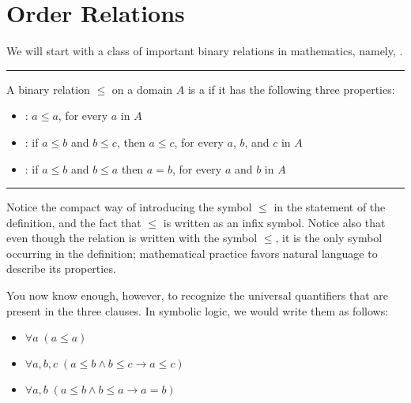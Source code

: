 \documentclass[letterpaper,10pt,english]{sphinxmanual}
\begin{document}
\section{Order Relations}
\label{\detokenize{relations:order-relations}}\label{\detokenize{relations:id2}}
\sphinxAtStartPar
We will start with a class of important binary relations in mathematics, namely, .


\bigskip\hrule\bigskip


\sphinxAtStartPar
{} A binary relation \(\leq\) on a domain \(A\) is a  if it has the following three properties:
\begin{itemize}
\item {} 
\sphinxAtStartPar
{}: \(a \leq a\), for every \(a\) in \(A\)

\item {} 
\sphinxAtStartPar
{}: if \(a \leq b\) and \(b \leq c\), then \(a \leq c\), for every \(a\), \(b\), and \(c\) in \(A\)

\item {} 
\sphinxAtStartPar
{}: if \(a \leq b\) and \(b \leq a\) then \(a = b\), for every \(a\) and \(b\) in \(A\)

\end{itemize}


\bigskip\hrule\bigskip


\sphinxAtStartPar
Notice the compact way of introducing the symbol \(\leq\) in the statement of the definition, and the fact that \(\leq\) is written as an infix symbol. Notice also that even though the relation is written with the symbol \(\leq\), it is the only symbol occurring in the definition; mathematical practice favors natural language to describe its properties.

\sphinxAtStartPar
You now know enough, however, to recognize the universal quantifiers that are present in the three clauses. In symbolic logic, we would write them as follows:
\begin{itemize}
\item {} 
\sphinxAtStartPar
\(\forall a \; (a \leq a)\)

\item {} 
\sphinxAtStartPar
\(\forall a, b, c \; (a \leq b \wedge b \leq c \to a \leq c)\)

\item {} 
\sphinxAtStartPar
\(\forall a, b \; (a \leq b \wedge b \leq a \to a = b)\)

\end{itemize}
\end{document}
